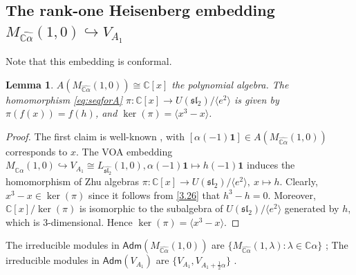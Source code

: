 \documentclass[12pt,a4paper,reqno]{amsart}
\numberwithin{equation}{section}
\numberwithin{equation}{section}
\newtheorem{lm}[thm]{Lemma}
\theoremstyle{definition}
\def \ra {\rightarrow}
\def \C {\mathbb{C}}
\def\la{\lambda}
\def \al{\alpha}
\def\hr{\hookrightarrow}
\def \vac {\mathbf{1}}
\def\<{\langle}
\def\>{\rangle}
\def\adm{\mathsf{Adm}}
\def\sl{\mathfrak{sl}}
\begin{document}
	\subsection{The rank-one Heisenberg embedding $M_{\widehat{\C\al}}(1,0)\hr V_{A_1}$} Note that this embedding is conformal. 
	
	\begin{lm}\label{lm:3.1}
		$A(M_{\widehat{\C\al}}(1,0))\cong \C[x]$ the polynomial algebra. The homomorphism \eqref{eq:seqforA} $\pi: \C[x]\ra U(\sl_2)/\<e^2\>$ is given by $\pi (f(x))=f(h)$, and $\ker(\pi)=\<x^3-x\>$. 
	\end{lm}
	\begin{proof}
		The first claim is well-known \cite{FZ92}, with $[\al(-1)\vac]\in A(M_{\widehat{\C\al}}(1,0))$ corresponds to $x$.
		The VOA embedding $M_{\widehat{\C\al}}(1,0)\hr V_{A_1}\cong L_{\widehat{\sl_2}}(1,0), \al(-1)\vac\mapsto h(-1)\vac$ induces the homomorphism of Zhu algebras $\pi: \C[x]\ra U(\sl_2)/\<e^2\>,\ x\mapsto h$. Clearly, $x^3-x\in \ker(\pi)$ since it follows from \eqref{3.26} that $h^3-h=0$. Moreover, $\C[x]/\ker(\pi)$ is isomorphic to the subalgebra of $U(\sl_2)/\<e^2\>$ generated by $h$, which is $3$-dimensional. Hence $\ker (\pi)=\<x^3-x\>$. 
	\end{proof}
	
	The irreducible modules in $\adm(M_{\widehat{\C\al}}(1,0))$ are $\{ M_{\widehat{\C\al}}(1,\la):\la\in \C\al\}$ \cite{FLM}; The irreducible modules in $\adm(V_{A_1})$ are $\{V_{A_1}, V_{A_1+\frac{1}{2}\al}\}$ \cite{D,FZ92}. 
	
\end{document}
